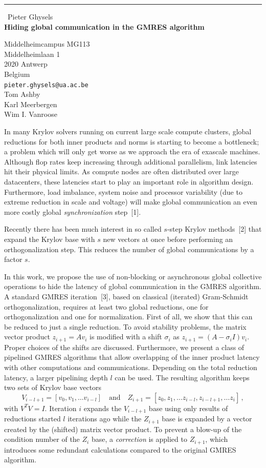 \documentclass{report}
\begin{document}
\begin{center}
\rule{6in}{1pt} \
{\large Pieter Ghysels \\
{\bf Hiding global communication in the GMRES algorithm}}

Middelheimcampus MG113 \\ Middelheimlaan 1 \\ 2020 Antwerp \\ Belgium
\\
{\tt pieter.ghysels@ua.ac.be}\\
Tom Ashby\\
Karl Meerbergen\\
Wim I. Vanroose\end{center}

In many Krylov solvers running on current large scale compute clusters,
global reductions for both inner products and norms is starting to become
a bottleneck; a problem which will only get worse as we approach the era
of exascale machines. Although flop rates keep increasing through
additional parallelism, link latencies hit their physical limits. As
compute nodes are often distributed over large datacenters, these
latencies start to play an important role in algorithm design.
Furthermore, load imbalance, system noise and processor variability (due
to extreme reduction in scale and voltage) will make global communication
an even more costly global \emph{synchronization} step~[1].

Recently there has been much interest in so called $s$-step Krylov
methods~[2] that expand the Krylov base with $s$ new vectors at once
before performing an orthogonalization step. This reduces the number of
global communications by a factor $s$.

In this work, we propose the use of non-blocking or asynchronous global
collective operations to hide the latency of global communication in the
GMRES algorithm. A standard GMRES iteration~[3], based on classical
(iterated) Gram-Schmidt orthogonalization, requires at least two global
reductions, one for orthogonalization and one for normalization. First of
all, we show that this can be reduced to just a single reduction. To
avoid stability problems, the matrix vector product $z_{i+1} = Av_i$ is
modified with a shift $\sigma_{i}$ as $z_{i+1} = \left( A - \sigma_i I
\right) v_{i}$. Proper choices of the shifts are discussed. Furthermore,
we present a class of pipelined GMRES algorithms that allow overlapping
of the inner product latency with other computations and communications.
Depending on the total reduction latency, a larger pipelining depth $l$
can be used. The resulting algorithm keeps two sets of Krylov base
vectors \[ V_{i-l+1}=[v_0,v_1,\ldots v_{i-l}] \quad \text{and} \quad
Z_{i+1}=[z_0,z_1, \ldots z_{i-l},z_{i-l+1},\ldots z_{i}] \, , \] with
$V^TV = I$. Iteration $i$ expands the $V_{i-l+1}$ base using only results
of reductions started $l$ iterations ago while the $Z_{i+1}$ base is
expanded by a vector created by the (shifted) matrix vector product. To
prevent a blow-up of the condition number of the $Z_i$ base, a
\emph{correction} is applied to $Z_{i+1}$, which introduces some
redundant calculations compared to the original GMRES algorithm.
\end{document}
